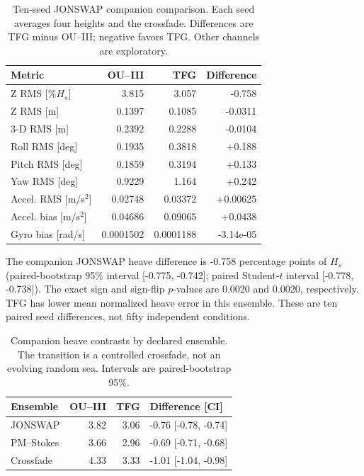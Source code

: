 \begin{table}[t]\centering\footnotesize
\caption{Ten-seed JONSWAP companion comparison. Each seed averages four heights and the crossfade. Differences are TFG minus OU--III; negative favors TFG. Other channels are exploratory.}
\label{tab:tfg-paired}\setlength{\tabcolsep}{3pt}
\begin{tabular}{@{}lrrr@{}}\toprule
Metric & OU--III & TFG & Difference\\\midrule
Z RMS [$\%H_s$] & 3.815 & 3.057 & -0.758\\
Z RMS [m] & 0.1397 & 0.1085 & -0.0311\\
3-D RMS [m] & 0.2392 & 0.2288 & -0.0104\\
Roll RMS [deg] & 0.1935 & 0.3818 & +0.188\\
Pitch RMS [deg] & 0.1859 & 0.3194 & +0.133\\
Yaw RMS [deg] & 0.9229 & 1.164 & +0.242\\
Accel. RMS [m/s$^2$] & 0.02748 & 0.03372 & +0.00625\\
Accel. bias [m/s$^2$] & 0.04686 & 0.09065 & +0.0438\\
Gyro bias [rad/s] & 0.0001502 & 0.0001188 & -3.14e-05\\
\bottomrule\end{tabular}\end{table}
The companion JONSWAP heave difference is -0.758 percentage points of $H_s$ (paired-bootstrap 95\% interval [-0.775, -0.742]; paired Student-$t$ interval [-0.778, -0.738]). The exact sign and sign-flip $p$-values are 0.0020 and 0.0020, respectively. TFG has lower mean normalized heave error in this ensemble.
These are ten paired seed differences, not fifty independent conditions.
\begin{table}[t]\centering\footnotesize
\caption{Companion heave contrasts by declared ensemble. The transition is a controlled crossfade, not an evolving random sea. Intervals are paired-bootstrap 95\%.}
\label{tab:tfg-ensembles}\setlength{\tabcolsep}{3pt}
\begin{tabular}{@{}lrrl@{}}\toprule
Ensemble & OU--III & TFG & Difference [CI]\\\midrule
JONSWAP & 3.82 & 3.06 & -0.76 [-0.78, -0.74]\\
PM--Stokes & 3.66 & 2.96 & -0.69 [-0.71, -0.68]\\
Crossfade & 4.33 & 3.33 & -1.01 [-1.04, -0.98]\\
\bottomrule\end{tabular}\end{table}
